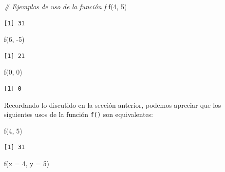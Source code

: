 \documentclass[
]{book}
\newenvironment{Shaded}{\begin{snugshade}}{\end{snugshade}}
\newcommand{\AttributeTok}[1]{\textcolor[rgb]{0.77,0.63,0.00}{#1}}
\newcommand{\CommentTok}[1]{\textcolor[rgb]{0.56,0.35,0.01}{\textit{#1}}}
\newcommand{\DecValTok}[1]{\textcolor[rgb]{0.00,0.00,0.81}{#1}}
\newcommand{\FunctionTok}[1]{\textcolor[rgb]{0.00,0.00,0.00}{#1}}
\newcommand{\NormalTok}[1]{#1}
\newcommand{\SpecialCharTok}[1]{\textcolor[rgb]{0.00,0.00,0.00}{#1}}
\begin{document}
\begin{Shaded}
\begin{Highlighting}[]
\CommentTok{\# Ejemplos de uso de la función f}
\FunctionTok{f}\NormalTok{(}\DecValTok{4}\NormalTok{, }\DecValTok{5}\NormalTok{)}
\end{Highlighting}
\end{Shaded}

\begin{verbatim}
[1] 31
\end{verbatim}

\begin{Shaded}
\begin{Highlighting}[]
\FunctionTok{f}\NormalTok{(}\DecValTok{6}\NormalTok{, }\SpecialCharTok{{-}}\DecValTok{5}\NormalTok{)}
\end{Highlighting}
\end{Shaded}

\begin{verbatim}
[1] 21
\end{verbatim}

\begin{Shaded}
\begin{Highlighting}[]
\FunctionTok{f}\NormalTok{(}\DecValTok{0}\NormalTok{, }\DecValTok{0}\NormalTok{)}
\end{Highlighting}
\end{Shaded}

\begin{verbatim}
[1] 0
\end{verbatim}

Recordando lo discutido en la sección anterior, podemos apreciar que los siguientes usos de la función \texttt{f()} son equivalentes:

\begin{Shaded}
\begin{Highlighting}[]
\FunctionTok{f}\NormalTok{(}\DecValTok{4}\NormalTok{, }\DecValTok{5}\NormalTok{)}
\end{Highlighting}
\end{Shaded}

\begin{verbatim}
[1] 31
\end{verbatim}

\begin{Shaded}
\begin{Highlighting}[]
\FunctionTok{f}\NormalTok{(}\AttributeTok{x =} \DecValTok{4}\NormalTok{, }\AttributeTok{y =} \DecValTok{5}\NormalTok{)}
\end{Highlighting}
\end{Shaded}
\end{document}
